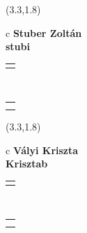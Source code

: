 \documentclass[11pt]{article}
\begin{document}
\makebox(3.3,1.8){
  \renewcommand\arraystretch{1.3}
  \begin{tabular}[c]{c}
    \hspace{8.5mm}
    \LARGE\bf{ Stuber Zoltán }\\
    \hspace{8.5mm}
    \Large{ stubi }\\
    \renewcommand\arraystretch{3}
    \begin{tabular}[c]{c}
      \centering
      \fontfamily{phv}\selectfont{
        \textbf{
          \textsc{
            \scriptsize{
            \color{Bright}{ Ismerkedő }\color{Dark}{ Webmester }\color{Bright}{ Sminkmester }\color{Bright}{ Programozó }
            }
          }
        }
      }
    \end{tabular}
    \\
    \renewcommand\arraystretch{1}
    \begin{tabular}{p{3.3in}}
      \hspace{.7cm}\\
      \hspace{.7cm}\emph{  }\\
    \end{tabular}
  \end{tabular}
}

\makebox(3.3,1.8){
  \renewcommand\arraystretch{1.3}
  \begin{tabular}[c]{c}
    \hspace{8.5mm}
    \LARGE\bf{ Vályi Kriszta }\\
    \hspace{8.5mm}
    \Large{ Krisztab }\\
    \renewcommand\arraystretch{3}
    \begin{tabular}[c]{c}
      \centering
      \fontfamily{phv}\selectfont{
        \textbf{
          \textsc{
            \scriptsize{
            \color{Dark}{ Ismerkedő }\color{Bright}{ Webmester }\color{Bright}{ Sminkmester }\color{Bright}{ Programozó }
            }
          }
        }
      }
    \end{tabular}
    \\
    \renewcommand\arraystretch{1}
    \begin{tabular}{p{3.3in}}
      \hspace{.7cm}\\
      \hspace{.7cm}\emph{  }\\
    \end{tabular}
  \end{tabular}
}
\end{document}
